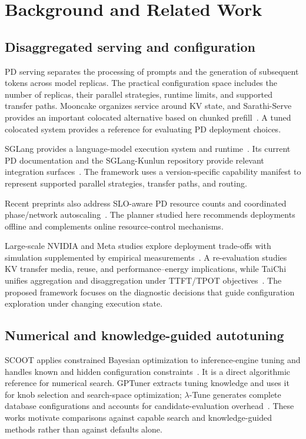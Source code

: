 \documentclass[11pt,a4paper]{article}
\begin{document}
\section{Background and Related Work}
\subsection{Disaggregated serving and configuration}
PD serving separates the processing of prompts and the generation of subsequent tokens across model replicas. The practical configuration space includes the number of replicas, their parallel strategies, runtime limits, and supported transfer paths. Mooncake organizes service around KV state, and Sarathi-Serve provides an important colocated alternative based on chunked prefill~\cite{mooncake2024,sarathi2024}. A tuned colocated system provides a reference for evaluating PD deployment choices.

SGLang provides a language-model execution system and runtime~\cite{sglang2024}. Its current PD documentation and the SGLang-Kunlun repository provide relevant integration surfaces~\cite{sglangpd,kunlunplugin}. The framework uses a version-specific capability manifest to represent supported parallel strategies, transfer paths, and routing.

Recent preprints also address SLO-aware PD resource counts and coordinated phase/network autoscaling~\cite{pdresources2026,tokenscale2025}. The planner studied here recommends deployments offline and complements online resource-control mechanisms.

Large-scale NVIDIA and Meta studies explore deployment trade-offs with simulation supplemented by empirical measurements~\cite{pragmatic2026,metaconfig2026}. A re-evaluation studies KV transfer media, reuse, and performance--energy implications, while TaiChi unifies aggregation and disaggregation under TTFT/TPOT objectives~\cite{revisiting2026,taichi2025}. The proposed framework focuses on the diagnostic decisions that guide configuration exploration under changing execution state.

\subsection{Numerical and knowledge-guided autotuning}
SCOOT applies constrained Bayesian optimization to inference-engine tuning and handles known and hidden configuration constraints~\cite{scoot2025}. It is a direct algorithmic reference for numerical search. GPTuner extracts tuning knowledge and uses it for knob selection and search-space optimization; $\lambda$-Tune generates complete database configurations and accounts for candidate-evaluation overhead~\cite{gptuner2024,lambdatune2025}. These works motivate comparisons against capable search and knowledge-guided methods rather than against defaults alone.
\end{document}
